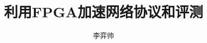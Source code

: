 \documentclass[bachelor]{ustcthesis}
\title{利用FPGA加速网络协议和评测}
\author{李弈帅}
\begin{document}
\maketitle

%
%
%
\frontmatter


\mainmatter
\tableofcontents
\listoffigures
\listoftables
\listofalgorithms  %

% 















\appendix

%
\end{document}
